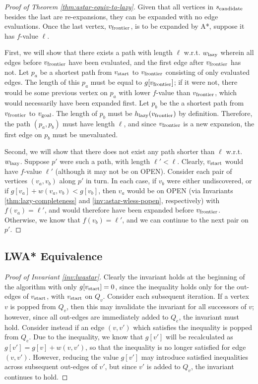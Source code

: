 \begin{proof}[Proof of Theorem \ref{thm:astar-equiv-to-lazy}]
Given that all vertices in $s_{\mbox{\scriptsize candidate}}$ besides the last
are re-expansions,
they can be expanded with no edge evaluations.
Once the last vertex,
$v_{\mbox{\scriptsize frontier}}$,
is to be expanded by A*,
suppose it has $f$-value $\ell$.

First,
we will show that there exists a path with length $\ell$ w.r.t.
$w_{\mbox{\scriptsize lazy}}$
wherein all edges before $v_{\mbox{\scriptsize frontier}}$ have been evaluated,
and the first edge after $v_{\mbox{\scriptsize frontier}}$ has not.
Let $p_a$ be a shortest path from $v_{\mbox{\scriptsize start}}$
to $v_{\mbox{\scriptsize frontier}}$ consisting of only evaluated edges.
The length of this $p_a$ must be equal to $g[v_{\mbox{\scriptsize frontier}}]$;
if it were not,
there would be some previous vertex on $p_a$ with lower $f$-value
than $v_{\mbox{\scriptsize frontier}}$,
which would necessarily have been expanded first.
Let $p_b$ be the a shortest path from $v_{\mbox{\scriptsize frontier}}$
to $v_{\mbox{\scriptsize goal}}$.
The length of $p_b$ must be $h_{\mbox{\scriptsize lazy}}(v_{\mbox{\scriptsize frontier}})$
by definition.
Therefore, the path $(p_a, p_b)$ must have length $\ell$,
and since $v_{\mbox{\scriptsize frontier}}$ is a new expansion,
the first edge on $p_b$ must be unevaluated.

Second,
we will show that there does not exist any path shorter than $\ell$
w.r.t. $w_{\mbox{\scriptsize lazy}}$.
Suppose $p'$ were such a path, with length $\ell' < \ell$.
Clearly, $v_{\mbox{\scriptsize start}}$ would have $f$-value $\ell'$ (although
it may not be on OPEN).
Consider each pair of vertices $(v_a, v_b)$ along $p'$ in turn.
In each case,
if $v_b$ were either undiscovered,
or if $g[v_a] + w(v_a, v_b) < g[v_b]$,
then $v_a$ would be on OPEN
(via Invariants \ref{thm:lazy-completeness}
and \ref{inv:astar-wless-popen}, respectively)
with $f(v_a) = \ell'$,
and would therefore have been expanded before $v_{\mbox{\scriptsize frontier}}$.
Otherwise,
we know that $f(v_b) = \ell'$,
and we can continue to the next pair on $p'$.
\end{proof}

\subsection{LWA* Equivalence}

\begin{proof}[Proof of Invariant \ref{inv:lwastar}]
Clearly the invariant holds at the beginning of the algorithm
with only $g[v_{\mbox{\scriptsize start}}] = 0$,
since the inequality holds only for the out-edges of $v_{\mbox{\scriptsize start}}$,
with $v_{\mbox{\scriptsize start}}$ on $Q_v$.
Consider each subsequent iteration.
If a vertex $v$ is popped from $Q_v$,
then this may invalidate the invariant for all successors of $v$;
however,
since all out-edges are immediately added to $Q_e$,
the invariant must hold.
Consider instead if an edge $(v, v')$ which satisfies the inequality
is popped from $Q_e$.
Due to the inequality,
we know that $g[v']$ will be recalculated as
$g[v'] = g[v] + w(v,v')$,
so that the inequality is no longer satisfied for edge $(v,v')$.
However,
reducing the value $g[v']$ may introduce satisfied inequalities across
subsequent out-edges of $v'$,
but since $v'$ is added to $Q_v$,
the invariant continues to hold.
\end{proof}

